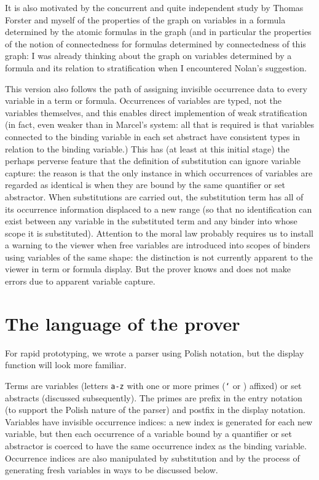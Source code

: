 \documentclass[12pt]{article}
\begin{document}
It is also motivated by the concurrent and quite independent
study by Thomas Forster and myself of the properties of the
graph on variables in a formula determined by the atomic
formulas in the graph (and in particular the properties of the
notion of connectedness for formulas determined by connectedness
of this graph:  I was already thinking about the graph on variables determined by a formula
and its relation to stratification when I encountered Nolan's suggestion.

This version also follows the path of assigning invisible
occurrence data to every variable in a term or formula.
Occurrences of variables are typed, not the variables
themselves, and this enables direct implemention of weak
stratification (in fact, even weaker than in Marcel's system:
all that is required is that variables connected to the binding
variable in each set abstract have consistent types in relation
to the binding variable.) This has (at least at this initial
stage) the perhaps perverse feature that the definition of
substitution can ignore variable capture: the reason is that the
only instance in which occurrences of variables are regarded as
identical is when they are bound by the same quantifier or set
abstractor. When
substitutions are carried out, the substitution term has all
of its occurrence information displaced to a new range (so that
no identification can exist between any variable
in the substituted term and any binder into whose scope it is
substituted).  Attention to the moral law probably
requires us to install a warning to the viewer when free
variables are introduced into scopes of binders using variables
of the same shape: the distinction is not currently apparent to the viewer
in term or formula display. But the prover knows and does not
make errors due to apparent variable capture.

\section{The language of the prover}

For rapid prototyping, we wrote a parser using Polish notation,
but the display function will look more familiar.

Terms are variables (letters {\tt a-z} with one or more primes
({\tt `} or {\tt *}) affixed) or set abstracts (discussed subsequently). The
primes are prefix in the entry notation (to support the Polish
nature of the parser) and postfix in the display notation.
Variables
have invisible occurrence indices: a new index is generated for
each new variable, but then each occurrence of a variable bound
by a quantifier or set abstractor is coerced to have the same
occurrence index as the binding variable. Occurrence indices are
also manipulated by substitution and by the process of
generating fresh variables in ways to be discussed below.
\end{document}
